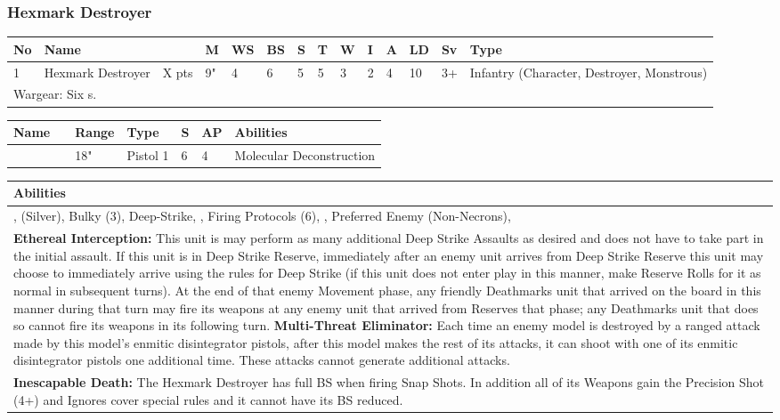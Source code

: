 \newpage
\subsubsection{Hexmark Destroyer}

\noindent
\begin{tabular}{||m{10pt} m{95pt} m{30pt} m{11pt} m{11pt} m{11pt} m{11pt} m{11pt} m{11pt} m{11pt} m{11pt} m{11pt} m{11pt} m{125pt}||}
	\hline
	No & Name & & M & WS & BS & S & T & W & I & A & LD & Sv & Type \\
	\hline
	1 & Hexmark Destroyer & X pts & 9" & 4 & 6 & 5 & 5 & 3 & 2 & 4 & 10 & 3+ & Infantry (Character, Destroyer, Monstrous) \\
	\hline
	\multicolumn{14}{||Z{532 pt}||}{Wargear: Six \quickref{Enmitic Disintegrator Pistol}s.} \\
	\hline
\end{tabular}

\noindent
\begin{tabular}{||m{140pt} m{00pt} m{31pt} m{55pt} m{12pt} m{12pt} m{210pt}||}
	\hline
	Name & & Range & Type & S & AP & Abilities \\
	\hline
	\quickref{Enmitic Disintegrator Pistol} &  & 18" & Pistol 1 & 6 & 4 & Molecular Deconstruction \\
	\hline
\end{tabular}

\noindent
\begin{tabular}{||m{532pt}||}
	\hline
	Abilities \\
	\hline
	\quickref{Annihilation Protocols}, \quickref{Awakening Protocols} (Silver), Bulky (3), Deep-Strike, \quickref{Hyperspace Hunters}, Firing Protocols (6), \quickref{Living Metal}, Preferred Enemy (Non-Necrons), \quickref{Reanimation Protocols} \\
	\textbf{Ethereal Interception:} This unit is may perform as many additional Deep Strike Assaults as desired and does not have to take part in the initial assault. If this unit is in Deep Strike Reserve, immediately after an enemy unit arrives from Deep Strike Reserve this unit may choose to immediately arrive using the rules for Deep Strike (if this unit does not enter play in this manner, make Reserve Rolls for it as normal in subsequent turns). At the end of that enemy Movement phase, any friendly Deathmarks unit that arrived on the board in this manner during that turn may fire its weapons at any enemy unit that arrived from Reserves that phase; any Deathmarks unit that does so cannot fire its weapons in its following turn.
	\textbf{Multi-Threat Eliminator:} Each time an enemy model is destroyed by a ranged attack made by this model's enmitic disintegrator pistols, after this model makes the rest of its attacks, it can shoot with one of its enmitic disintegrator pistols one additional time. These attacks cannot generate additional attacks. \\
	\textbf{Inescapable Death:} The Hexmark Destroyer has full BS when firing Snap Shots. In addition all of its Weapons gain the Precision Shot (4+) and Ignores cover special rules and it cannot have its BS reduced. \\
	\hline
\end{tabular}

